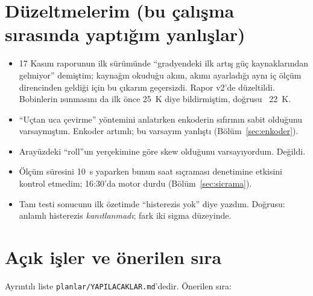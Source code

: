 \documentclass[11pt,a4paper]{article}
\newcommand{\kod}[1]{\texttt{#1}}
\begin{document}
\section{Düzeltmelerim (bu çalışma sırasında yaptığım yanlışlar)}

\begin{itemize}
\item 17 Kasım raporunun ilk sürümünde ``gradyendeki ilk artış güç kaynaklarından gelmiyor'' demiştim; kaynağın
okuduğu akım, akımı ayarladığı aynı iç ölçüm direncinden geldiği için bu çıkarım geçersizdi. Rapor v2'de
düzeltildi. Bobinlerin ısınmasını da ilk önce 25~K diye bildirmiştim, doğrusu ~22~K.
\item ``Uçtan uca çevirme'' yöntemini anlatırken enkoderin sıfırının sabit olduğunu varsaymıştım. Enkoder artımlı;
bu varsayım yanlıştı (Bölüm~\ref{sec:enkoder}).
\item Arayüzdeki ``roll''un yerçekimine göre skew olduğunu varsayıyordum. Değildi.
\item Ölçüm süresini 10~s yaparken bunun saat sıçraması denetimine etkisini kontrol etmedim; 16:30'da motor
durdu (Bölüm~\ref{sec:sicrama}).
\item Tanı testi sonucunu ilk özetimde ``histerezis yok'' diye yazdım. Doğrusu: anlamlı histerezis
\emph{kanıtlanmadı}; fark iki sigma düzeyinde.
\end{itemize}

\section{Açık işler ve önerilen sıra}
\label{sec:acik}

Ayrıntılı liste \kod{planlar/YAPILACAKLAR.md}'dedir. Önerilen sıra:
\end{document}

